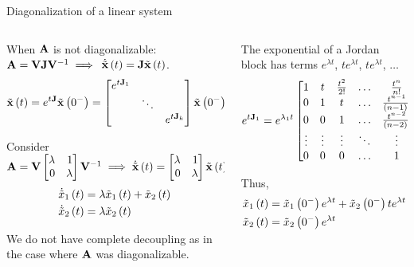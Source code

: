 \documentclass[aspectratio=169]{beamer}
\def\mf{\ensuremath\mathbf}
\def\lp{\ensuremath\left(}
\def\rp{\ensuremath\right)}
\def\bmx{\ensuremath\begin{bmatrix*}[r]}
\def\emx{\ensuremath\end{bmatrix*}}
\def\bmxc{\ensuremath\begin{bmatrix*}[c]}
\newcommand{\ct}[1]{\lp #1\rp}
\begin{document}
\begin{frame}{Diagonalization of a linear system}
\begin{columns}
\begin{column}{0.5\textwidth}
\begin{small}
When $\mf{A}$ is not diagonalizable: $\mf{A} = \mf{V}\mf{J}\mf{V}^{-1} \implies$ $\dot{\tilde{\mf{x}}}\ct{t} = \mf{J}\tilde{\mf{x}}\ct{t}$.
\[ \tilde{\mf{x}}\ct{t} = e^{t\mf{J}}\tilde{\mf{x}}\ct{0^-} = \bmx 
e^{t\mf{J}_1} & & \\
 & \ddots & \\
 & & e^{t\mf{J}_k}
\emx \tilde{\mf{x}}\ct{0^-} \]

Consider $\mf{A} = \mf{V}\bmx \lambda & 1 \\ 0 & \lambda\emx\mf{V}^{-1} \implies \dot{\tilde{\mf{x}}}\ct{t} = \bmx \lambda & 1 \\ 0 & \lambda\emx\tilde{\mf{x}}\ct{t}$ 
\[ \begin{split}
\dot{\tilde{x}}_1\ct{t} &= \lambda\tilde{x}_1\ct{t} + \tilde{x}_2\ct{t}\\
\dot{\tilde{x}}_2\ct{t} &= \lambda\tilde{x}_2\ct{t}
\end{split}  \]

We do not have complete decoupling as in the case where $\mf{A}$ was diagonalizable.
\end{small}
\end{column}
\begin{column}{0.5\textwidth}
\begin{small}

The exponential of a Jordan block has terms $e^{\lambda t}$, $te^{\lambda t}$, $te^{\lambda t}$, $\ldots$
\[ e^{t\mf{J}_1} = e^{\lambda_1 t}\bmxc 
1 & t & \frac{t^2}{2!} & \ldots & \frac{t^n}{n!}\\ 
0 & 1 & t & \ldots & \frac{t^{n-1}}{\lp n-1\rp!}\\
0 & 0 & 1 & \ldots & \frac{t^{n-2}}{\lp n-2\rp!}\\
\vdots & \vdots & \vdots & \ddots & \vdots\\
0 & 0 & 0 & \ldots & 1
\emx \]

Thus, 
\[ \begin{split}
\tilde{x}_1\ct{t} &= \tilde{x}_1\ct{0^-}e^{\lambda t} + \tilde{x}_2\ct{0^-}te^{\lambda t}\\
\tilde{x}_2\ct{t} &= \tilde{x}_2\ct{0^-}e^{\lambda t}
\end{split} \]
\end{small}
\end{column}
\end{columns}
\end{frame}
\end{document}
